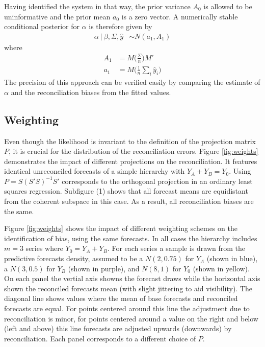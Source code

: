 \documentclass[a4paper,fleqn,11pt]{article}
\begin{document}
 Having identified the system in that way, the prior variance $A_0$ is allowed to be uninformative and the prior mean $a_0$ is a zero vector. A numerically stable conditional posterior for $\alpha$ is therefore given by
\begin{align}
	\label{eq:alpha}
	\alpha\ |\ \beta,\Sigma,\hat{y} &\sim N(a_1,A_1)
\end{align}
where
\begin{align*}
	A_1 &= M\Bigg(\frac{\Sigma}{n}\Bigg)M'\\
	a_1 &= M\Bigg(\frac{1}{n}\sum_i \hat{y}_i\Bigg) 
\end{align*}
The precision of this approach can be verified easily by comparing the estimate of $\alpha$ and the reconciliation biases from the fitted values. \\


\subsection{Weighting}
\label{sec:weighting}
Even though the likelihood is invariant to the definition of the projection matrix $P$, it is crucial for the distribution of the reconciliation errors. Figure \ref{fig:weights} demonstrates the impact of different projections on the reconciliation. It features identical unreconciled forecasts of a simple hierarchy with $Y_A + Y_B = Y_0$. Using $P = S(S'S)^{-1}S'$ corresponds to the orthogonal projection in an ordinary least squares regression. Subfigure (1) shows that all forecast means are equidistant from the coherent subspace in this case. As a result, all reconciliation biases are the same.

Figure \ref{fig:weights} shows the impact of different weighting schemes on the identification of bias, using the same forecasts. In all cases the hierarchy includes $m=3$ series where $Y_0=Y_A+Y_B$.  For each series a sample is drawn from the predictive forecasts density, assumed to be a $N(2,0.75)$ for $Y_A$ (shown in blue), a $N(3,0.5)$ for $Y_B$ (shown in purple), and  $N(8,1)$ for $Y_0$ (shown in yellow).  On each panel the vertial axis showns the forecast draws while the horizontal axis shown the reconciled forecasts mean (with slight jittering to aid visibility).  The diagonal line shows values where the mean of base forecasts and reconciled forecasts are equal. For points centered around this line the adjustment due to reconciliation is minor, for points centered around a value on the right and below (left and above) this line forecasts are adjusted upwards (downwards) by reconciliation.  Each panel corresponds to a different choice of $P$.
\end{document}
